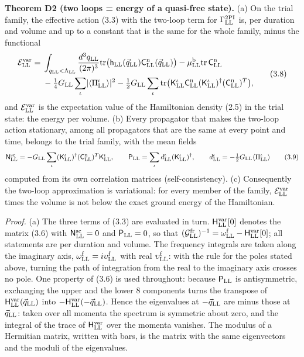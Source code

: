 \documentclass[
  10pt,
]{article}
\begin{document}
\textbf{Theorem D2 (two loops = energy of a quasi-free state).} (a) On
the trial family, the effective action (3.3) with the two-loop term for
\(\Gamma^{\rm 2PI}_{\rm LL}\) is, per duration and volume and up to a
constant that is the same for the whole family, minus the functional
\[\begin{aligned}\mathcal E^{\rm var}_{\rm LL}={}&\int_{q_{\rm LL}<\Lambda_{\rm LL}}\frac{d^3q_{\rm LL}}{(2\pi)^3}\mathrm{tr}\big(\mathsf h_{\rm LL}(\vec q_{\rm LL})\mathsf C^{\rm n}_{\rm LL}(\vec q_{\rm LL})\big)
-\mu^{\rm b}_{\rm LL}\mathrm{tr}\,\mathsf C^{\rm n}_{\rm LL}\\
&-\tfrac14G_{\rm LL}\sum_\iota\lvert\langle\Pi^\iota_{\rm LL}\rangle\rvert^2
-\tfrac12G_{\rm LL}\sum_\iota\mathrm{tr}\big(\mathsf K^\iota_{\rm LL}\mathsf C^{\rm n}_{\rm LL}(\mathsf K^\iota_{\rm LL})^\dagger(\mathsf C^{\rm n}_{\rm LL})^T\big),\end{aligned}\tag{3.8}\]
and \(\mathcal E^{\rm var}_{\rm LL}\) is the expectation value of the
Hamiltonian density (2.5) in the trial state: the energy per volume. (b)
Every propagator that makes the two-loop action stationary, among all
propagators that are the same at every point and time, belongs to the
trial family, with the mean fields
\[\mathsf N^{\rm sc}_{\rm LL}=-G_{\rm LL}\sum_\iota(\mathsf K^\iota_{\rm LL})^\dagger(\mathsf C^{\rm n}_{\rm LL})^T\mathsf K^\iota_{\rm LL},\qquad
\mathsf P_{\rm LL}=\sum_\iota d^\iota_{\rm LL}(\mathsf K^\iota_{\rm LL})^\dagger,\qquad d^\iota_{\rm LL}=-\tfrac12G_{\rm LL}\langle\Pi^\iota_{\rm LL}\rangle\tag{3.9}\]
computed from its own correlation matrices (self-consistency). (c)
Consequently the two-loop approximation is variational: for every member
of the family, \(\mathcal E^{\rm var}_{\rm LL}\) times the volume is not
below the exact ground energy of the Hamiltonian.

\emph{Proof.} (a) The three terms of (3.3) are evaluated in turn.
\(\mathsf H^{\rm var}_{\rm LL}[0]\) denotes the matrix (3.6) with
\(\mathsf N^{\rm sc}_{\rm LL}=0\) and \(\mathsf P_{\rm LL}=0\), so that
\((\mathcal G^{\rm fr}_{\rm LL})^{-1}=\omega^{\rm f}_{\rm LL}-\mathsf H^{\rm var}_{\rm LL}[0]\);
all statements are per duration and volume. The frequency integrals are
taken along the imaginary axis,
\(\omega^{\rm f}_{\rm LL}=i\upsilon^{\rm f}_{\rm LL}\) with real
\(\upsilon^{\rm f}_{\rm LL}\): with the rule for the poles stated above,
turning the path of integration from the real to the imaginary axis
crosses no pole. One property of (3.6) is used throughout: because
\(\mathsf P_{\rm LL}\) is antisymmetric, exchanging the upper and the
lower 8 components turns the transpose of
\(\mathsf H^{\rm var}_{\rm LL}(\vec q_{\rm LL})\) into
\(-\mathsf H^{\rm var}_{\rm LL}(-\vec q_{\rm LL})\). Hence the
eigenvalues at \(-\vec q_{\rm LL}\) are minus those at
\(\vec q_{\rm LL}\): taken over all momenta the spectrum is symmetric
about zero, and the integral of the trace of
\(\mathsf H^{\rm var}_{\rm LL}\) over the momenta vanishes. The modulus
of a Hermitian matrix, written with bars, is the matrix with the same
eigenvectors and the moduli of the eigenvalues.
\end{document}
